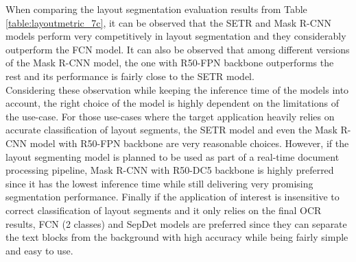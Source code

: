 \documentclass[letterpaper]{article} %
\begin{document}


When comparing the layout segmentation evaluation results from Table \ref{table:layoutmetric_7c}, it can be observed that the SETR and Mask R-CNN models perform very competitively in layout segmentation and they considerably outperform the FCN model. It can also be observed that among different versions of the Mask R-CNN model, the one with R50-FPN backbone outperforms the rest and its performance is fairly close to the SETR model. \\ Considering these observation while keeping the inference time of the models into account, the right choice of the model is highly dependent on the limitations of the use-case. For those use-cases where the target application heavily relies on accurate classification of layout segments, the SETR model and even the Mask R-CNN model with R50-FPN backbone are very reasonable choices. However, if the layout segmenting model is planned to be used as part of a real-time document processing pipeline, Mask R-CNN with R50-DC5 backbone is highly preferred since it has the lowest inference time while still delivering very promising segmentation performance. Finally if the application of interest is insensitive to correct classification of layout segments and it only relies on the final OCR results, FCN (2 classes) and SepDet models are preferred since they can separate the text blocks from the background with high accuracy while being fairly simple and easy to use.
\end{document}
